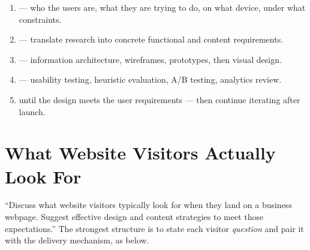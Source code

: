 \documentclass{MMTextbook}
\begin{document}
\begin{enumerate}
\item {} --- who the users are, what they are
      trying to do, on what device, under what constraints.
\item {} --- translate research into concrete
      functional and content requirements.
\item {} --- information architecture, wireframes,
      prototypes, then visual design.
\item {} --- usability testing, heuristic
      evaluation, A/B testing, analytics review.
\item {} until the design meets the user requirements --- then continue
      iterating after launch.
\end{enumerate}

\section{What Website Visitors Actually Look For}

\begin{keybox}
``Discuss what website visitors typically look for when they land on a business
webpage. Suggest effective design and content strategies to meet those
expectations.''
The strongest structure is to state each visitor \emph{question} and pair it with
the delivery mechanism, as below.
\end{keybox}
\end{document}
